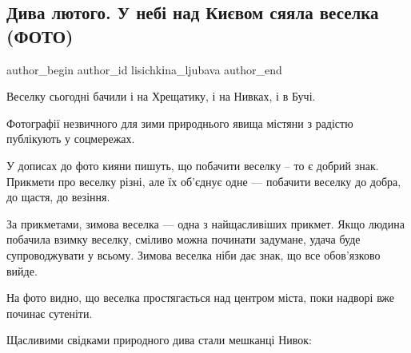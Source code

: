  
 
 
 
 
 
\subsection{Дива лютого. У небі над Києвом сяяла веселка (ФОТО)}
\label{sec:18_02_2022.stz.kiev.bigkyiv.1.kiev_veselka_foto}
 
\ifcmt
 author_begin
   author_id lisichkіna_ljubava
 author_end
\fi

Веселку сьогодні бачили і на Хрещатику, і на Нивках, і в Бучі.

Фотографії незвичного для зими природнього явища містяни з радістю публікують у
соцмережах. 


У дописах до фото кияни пишуть, що  побачити веселку – то є добрий знак.
Прикмети про веселку різні, але їх об’єднує одне — побачити веселку до добра,
до щастя, до везіння.

За прикметами, зимова веселка — одна з найщасливіших прикмет. Якщо людина
побачила взимку веселку,  сміливо можна починати задумане, удача буде
супроводжувати у всьому.  Зимова веселка ніби  дає  знак, що все обов’язково
вийде.

На фото видно, що веселка простягається над центром міста, поки надворі вже
починає сутеніти.

Щасливими свідками природного дива стали мешканці Нивок:


